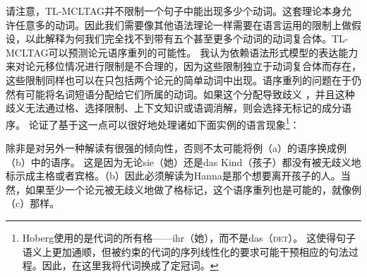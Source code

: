 请注意，TL-MCLTAG并不限制一个句子中能出现多少个动词。这套理论本身允许任意多的动词。因此我们需要像其他语法理论一样需要在语言运用的限制上做假设，以此解释为何我们完全找不到带有五个甚至更多个动词的动词复合体。TL-MCLTAG可以预测论元语序重列的可能性。
我认为依赖语法形式模型的表达能力来对论元移位情况进行限制是不合理的，因为这些限制独立于动词复合体而存在，这些限制同样也可以在只包括两个论元的简单动词中出现。语序重列的问题在于仍然有可能将名词短语分配给它们所属的动词。如果这个分配导致歧义
，并且这种歧义无法通过格、选择限制、上下文知识或语调消解，则会选择无标记的成分语序。
 \citet*[]{Hoberg81a}论证了基于这一点可以很好地处理诸如下面实例的语言现象\footnote{%
Hoberg使用的是代词的所有格——ihr（她），而不是das（\textsc{det}）。
这使得句子语义上更加通顺，但被约束的代词的序列线性化的要求可能干预相应的句法过程。因此，在这里我将代词换成了定冠词。
}：
\eal
\judgewidth{\#}
\zl

\noindent
除非是对另外一种解读有很强的倾向性，否则不太可能将例（a）的语序换成例（b）中的语序。
这是因为无论sie（她）还是das Kind（孩子）都没有被无歧义地标示成主格或者宾格。（b）因此必须解读为Hanna是那个想要离开孩子的人。当然，如果至少一个论元被无歧义地做了格标记，这个语序重列也是可能的，就像例（c）那样。

